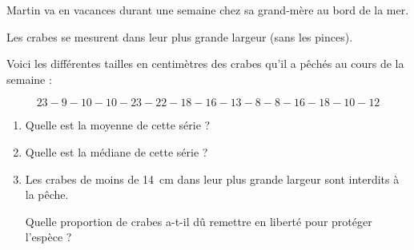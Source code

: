 
\medskip

Martin va en vacances durant une semaine chez sa grand-mère
au bord de la mer.

Les crabes se mesurent dans leur plus grande largeur (sans les pinces).

Voici les différentes tailles en centimètres des crabes qu'il a
pêchés au cours de la semaine :

\[23 - 9 - 10 - 10 - 23 - 22 - 18 - 16 - 13 - 8 - 8 - 16 - 18 - 10 - 12\]

\begin{enumerate}
\item Quelle est la moyenne de cette série ?
\item Quelle est la médiane de cette série ?
\item Les crabes de moins de 14~cm dans leur plus grande largeur sont interdits à la pêche. 

Quelle proportion de crabes a-t-il dû remettre en liberté pour protéger l'espèce ?
\end{enumerate}

\vspace{0,5cm}

